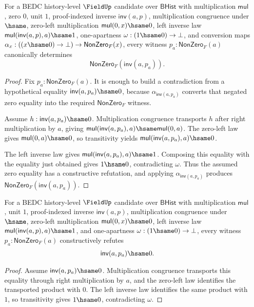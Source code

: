 \begin{theorem}
\label{thm:field-inverse-nonzero-from-one-apartness}
For a BEDC history-level $\FieldUp$ candidate over $\mathsf{BHist}$ with
multiplication $\mathsf{mul}$, zero $0$, unit $1$, proof-indexed inverse
$\mathsf{inv}(a,p)$, multiplication congruence under $\hsame$, zero-left
multiplication $\mathsf{mul}(0,x)\hsame 0$, left inverse law
$\mathsf{mul}(\mathsf{inv}(a,p),a)\hsame 1$, one-apartness
$\omega:(1\hsame 0)\to\bot$, and conversion maps
$\alpha_x:((x\hsame 0)\to\bot)\to\mathsf{NonZero}_F(x)$, every witness
$p_a:\mathsf{NonZero}_F(a)$ canonically determines
$$
\mathsf{NonZero}_F(\mathsf{inv}(a,p_a)).
$$
\end{theorem}
\begin{proof}
Fix $p_a:\mathsf{NonZero}_F(a)$. It is enough to build a contradiction
from a hypothetical equality $\mathsf{inv}(a,p_a)\hsame 0$, because
$\alpha_{\mathsf{inv}(a,p_a)}$ converts that negated zero equality into
the required $\mathsf{NonZero}_F$ witness.

Assume $h:\mathsf{inv}(a,p_a)\hsame 0$. Multiplication congruence transports
$h$ after right multiplication by $a$, giving
$\mathsf{mul}(\mathsf{inv}(a,p_a),a)\hsame\mathsf{mul}(0,a)$. The zero-left
law gives $\mathsf{mul}(0,a)\hsame 0$, so transitivity yields
$\mathsf{mul}(\mathsf{inv}(a,p_a),a)\hsame 0$.

The left inverse law gives
$\mathsf{mul}(\mathsf{inv}(a,p_a),a)\hsame 1$. Composing this equality with
the equality just obtained gives $1\hsame 0$, contradicting $\omega$. Thus
the assumed zero equality has a constructive refutation, and applying
$\alpha_{\mathsf{inv}(a,p_a)}$ produces
$\mathsf{NonZero}_F(\mathsf{inv}(a,p_a))$.
\end{proof}

\begin{theorem}
\label{thm:field-inverse-apart-empty-from-one-apartness}
For a BEDC history-level $\FieldUp$ candidate over $\mathsf{BHist}$ with
multiplication $\mathsf{mul}$, unit $1$, proof-indexed inverse
$\mathsf{inv}(a,p)$, multiplication congruence under $\hsame$, zero-left
multiplication $\mathsf{mul}(0,x)\hsame 0$, left inverse law
$\mathsf{mul}(\mathsf{inv}(a,p),a)\hsame 1$, and one-apartness
$\omega:(1\hsame 0)\to\bot$, every witness $p_a:\mathsf{NonZero}_F(a)$
constructively refutes
$$
\mathsf{inv}(a,p_a)\hsame 0.
$$
\end{theorem}
\begin{proof}
Assume $\mathsf{inv}(a,p_a)\hsame 0$. Multiplication congruence transports
this equality through right multiplication by $a$, and the zero-left law
identifies the transported product with $0$. The left inverse law identifies
the same product with $1$, so transitivity gives $1\hsame 0$, contradicting
$\omega$.
\end{proof}

